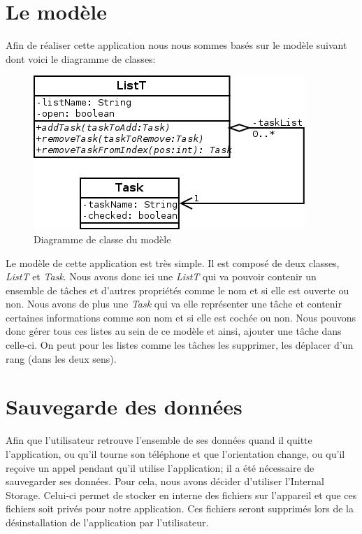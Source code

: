 \documentclass[a4paper,10pt]{article}
\begin{document}

\newpage
\section{Le modèle}
Afin de réaliser cette application nous nous sommes basés sur le modèle suivant dont voici le diagramme de classes:
\begin{figure}[htpb]
	\center
	\includegraphics[scale=0.5]{Images/dia_classe.png}
	\caption{Diagramme de classe du modèle}
\end{figure}

Le modèle de cette application est très simple. Il est composé de deux classes, \textit{ListT} et \textit{Task}.
Nous avons donc ici une \textit{ListT} qui va pouvoir contenir un ensemble de tâches et d'autres propriétés comme le nom et si elle est ouverte ou non. Nous avons de plus une \textit{Task} qui va elle représenter une tâche et contenir certaines informations comme son nom et si elle est cochée ou non.
Nous pouvons donc gérer tous ces listes au sein de ce modèle et ainsi, ajouter une tâche dans celle-ci. On peut pour les listes comme les tâches les supprimer, les déplacer d'un rang (dans les deux sens).

\newpage
\section{Sauvegarde des données}
Afin que l'utilisateur retrouve l'ensemble de ses données quand il quitte l'application, ou qu'il tourne son téléphone et que l'orientation change, ou qu'il reçoive un appel pendant qu'il utilise l'application; il a été nécessaire de sauvegarder ses données. Pour cela, nous avons décider d'utiliser l'Internal Storage. Celui-ci permet de stocker en interne des fichiers sur l'appareil et que ces fichiers soit privés pour notre application. Ces fichiers seront supprimés lors de la désinstallation de l'application par l'utilisateur.
\end{document}
